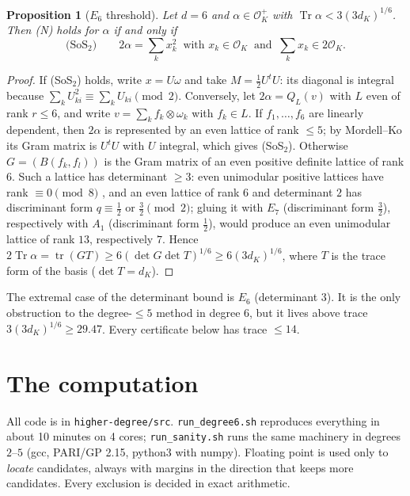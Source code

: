 \documentclass[11pt]{amsart}
\newtheorem{proposition}[theorem]{Proposition}
\theoremstyle{definition}
\DeclareMathOperator{\Tr}{Tr}
\newcommand{\OK}{\mathcal{O}_K}
\newcommand{\file}[1]{\texttt{#1}}
\begin{document}
\begin{proposition}[$E_6$ threshold]\label{prop:e6}
Let $d=6$ and $\alpha\in\OK^+$ with $\Tr\alpha<3(3d_K)^{1/6}$.  Then (N) holds for $\alpha$ if
and only if
\[
\text{(SoS$_2$)}\qquad 2\alpha=\sum_k x_k^2\ \text{ with } x_k\in\OK\ \text{ and }\ \sum_kx_k\in2\OK .
\]
\end{proposition}

\begin{proof}
If (SoS$_2$) holds, write $x=U\omega$ and take $M=\frac12U^tU$: its diagonal is integral
because $\sum_kU_{ki}^2\equiv\sum_kU_{ki}\pmod 2$.  Conversely, let $2\alpha=Q_L(v)$ with $L$
even of rank $r\le6$, and write $v=\sum_kf_k\otimes\omega_k$ with $f_k\in L$.  If
$f_1,\dots,f_6$ are linearly dependent, then $2\alpha$ is represented by an even lattice of
rank $\le5$; by Mordell--Ko \cite{Ko,Mo} its Gram matrix is $U^tU$ with $U$ integral, which
gives (SoS$_2$).  Otherwise $G=(B(f_k,f_l))$ is the Gram matrix of an even positive definite
lattice of rank $6$.  Such a lattice has determinant $\ge3$: even unimodular positive
lattices have rank $\equiv0\pmod8$ \cite[Ch.~V]{Se}, and an even lattice of rank $6$ and
determinant $2$ has discriminant form $q\equiv\frac12$ or $\frac32\pmod 2$; gluing it with
$E_7$ (discriminant form $\frac32$), respectively with $A_1$ (discriminant form $\frac12$),
would produce an even unimodular lattice of rank $13$, respectively $7$.  Hence
$2\Tr\alpha=\operatorname{tr}(GT)\ge6(\det G\det T)^{1/6}\ge6(3d_K)^{1/6}$, where $T$ is the
trace form of the basis ($\det T=d_K$).
\end{proof}

The extremal case of the determinant bound is $E_6$ (determinant $3$).  It is the only obstruction to the degree-$\le5$ method in degree $6$, but
it lives above trace $3(3d_K)^{1/6}\ge29.47$.  Every certificate below has trace $\le14$.

\section{The computation}\label{sec:computation}

All code is in \file{higher-degree/src}.  \file{run\_degree6.sh} reproduces everything in
about 10 minutes on 4 cores; \file{run\_sanity.sh} runs the same machinery in degrees $2$--$5$ (gcc, PARI/GP 2.15, python3 with numpy).  Floating point is used
only to \emph{locate} candidates, always with margins in the direction that keeps more
candidates.  Every exclusion is decided in exact arithmetic.
\end{document}
